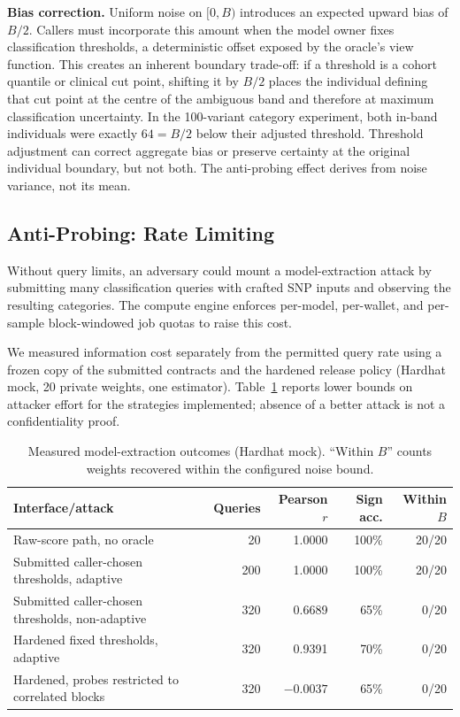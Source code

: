 \documentclass[10pt,twocolumn]{article}
\begin{document}
\textbf{Bias correction.}
Uniform noise on $[0, B)$ introduces an expected upward bias of $B/2$.  Callers
must incorporate this amount when the model owner fixes classification thresholds, a
deterministic offset exposed by the oracle's view function.  This creates an inherent
boundary trade-off: if a threshold is a cohort quantile or clinical cut point, shifting
it by $B/2$ places the individual defining that cut point at the centre of the ambiguous
band and therefore at maximum classification uncertainty.  In the 100-variant category
experiment, both in-band individuals were exactly $64=B/2$ below their adjusted
threshold.  Threshold adjustment can correct aggregate bias or preserve certainty at
the original individual boundary, but not both.  The anti-probing effect derives from
noise variance, not its mean.

\subsection{Anti-Probing: Rate Limiting}

Without query limits, an adversary could mount a model-extraction attack by
submitting many classification queries with crafted SNP inputs and observing
the resulting categories.  The compute engine enforces per-model, per-wallet, and
per-sample block-windowed job quotas to raise this cost.

We measured information cost separately from the permitted query rate using a frozen
copy of the submitted contracts and the hardened release policy (Hardhat mock, 20
private weights, one estimator).  Table~\ref{tab:probing} reports lower bounds on
attacker effort for the strategies implemented; absence of a better attack is not a
confidentiality proof.

\begin{table}[t]
\centering
\caption{Measured model-extraction outcomes (Hardhat mock).  ``Within $B$'' counts
weights recovered within the configured noise bound.}
\label{tab:probing}
\small
\begin{tabularx}{\textwidth}{@{}Xrrrr@{}}
\toprule
\textbf{Interface/attack} & \textbf{Queries} & \textbf{Pearson $r$} & \textbf{Sign acc.} & \textbf{Within $B$} \\
\midrule
Raw-score path, no oracle & 20 & 1.0000 & 100\% & 20/20 \\
Submitted caller-chosen thresholds, adaptive & 200 & 1.0000 & 100\% & 20/20 \\
Submitted caller-chosen thresholds, non-adaptive & 320 & 0.6689 & 65\% & 0/20 \\
Hardened fixed thresholds, adaptive & 320 & 0.9391 & 70\% & 0/20 \\
Hardened, probes restricted to correlated blocks & 320 & $-0.0037$ & 65\% & 0/20 \\
\bottomrule
\end{tabularx}
\end{table}
\end{document}
